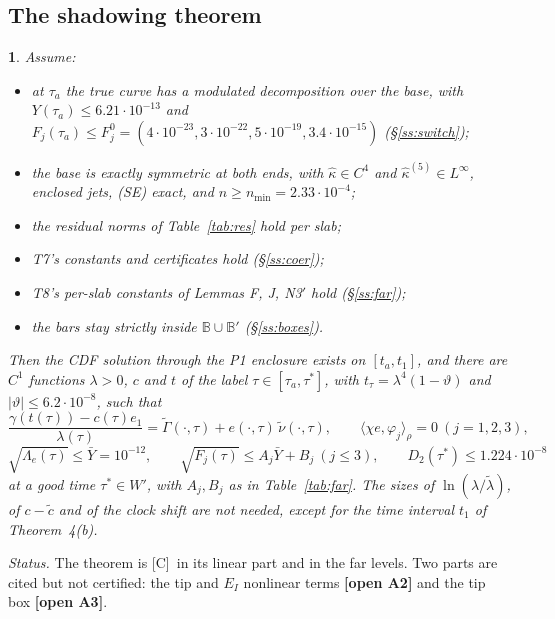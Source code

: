 \documentclass[11pt]{article}
\newtheorem*{namedthm*}{\thisthmname}
\newcommand{\thisthmname}{}
\newenvironment{named}[1]{\renewcommand{\thisthmname}{#1}\begin{namedthm*}}{\end{namedthm*}}
\theoremstyle{definition}
\theoremstyle{remark}
\newcommand{\tC}{\textnormal{\textsc{[C]}}}
\newcommand{\OPEN}[1]{\textcolor{red!75!black}{\textbf{\textsf{[open #1]}}}}
\newcommand{\ip}[2]{\langle #1,#2\rangle}
\newcommand{\abs}[1]{\lvert #1\rvert}
\newcommand{\Gt}{\tilde\Gamma}
\newcommand{\Yb}{\bar Y}
\newcommand{\Lam}{\Lambda}
\begin{document}
\subsection{The shadowing theorem}
\begin{named}{Theorem P2 (shadowing; consolidated from T5 \S1.3)}
Assume:
\begin{itemize}[leftmargin=2em]
\item[(I)] at $\tau_a$ the true curve has a modulated decomposition over the base, with $Y(\tau_a)\le6.21\cdot10^{-13}$ and $F_j(\tau_a)\le F_j^0=(4\cdot10^{-23},3\cdot10^{-22},5\cdot10^{-19},3.4\cdot10^{-15})$ (\S\ref{ss:switch});
\item[(B)] the base is exactly symmetric at both ends, with $\hat\kappa\in C^4$ and $\hat\kappa^{(5)}\in L^\infty$, enclosed jets, (SE) exact, and $n\ge n_{\min}=2.33\cdot10^{-4}$;
\item[(R)] the residual norms of Table~\ref{tab:res} hold per slab;
\item[(C)] T7's constants and certificates hold (\S\ref{ss:coer});
\item[(F)] T8's per-slab constants of Lemmas F, J, N3$'$ hold (\S\ref{ss:far});
\item[($\mathbb B$)] the bars stay strictly inside $\mathbb B\cup\mathbb B'$ (\S\ref{ss:boxes}).
\end{itemize}
Then the CDF solution through the P1 enclosure exists on $[t_a,t_1]$, and there are $C^1$ functions $\lambda>0$, $c$ and $t$ of the label $\tau\in[\tau_a,\tau^*]$, with $t_\tau=\lambda^4(1-\vartheta)$ and $\abs\vartheta\le6.2\cdot10^{-8}$, such that
\[
\frac{\gamma(t(\tau))-c(\tau)e_1}{\lambda(\tau)}=\Gt(\cdot,\tau)+e(\cdot,\tau)\,\tilde\nu(\cdot,\tau),\qquad\ip{\chi e}{\varphi_j}_\rho=0\ (j=1,2,3),
\]
\[
\sqrt{\Lam_e(\tau)}\le\Yb=10^{-12},\qquad\sqrt{F_j(\tau)}\le A_j\Yb+B_j\ (j\le3),\qquad D_2(\tau^*)\le1.224\cdot10^{-8}
\]
at a good time $\tau^*\in W'$, with $A_j,B_j$ as in Table~\ref{tab:far}. The sizes of $\ln(\lambda/\tilde\lambda)$, of $c-\tilde c$ and of the clock shift are not needed, except for the time interval $t_1$ of Theorem~4(b).
\end{named}
\noindent\emph{Status.} The theorem is \tC\ in its linear part and in the far levels. Two parts are cited but not certified: the tip and $E_I$ nonlinear terms \OPEN{A2} and the tip box \OPEN{A3}.
\end{document}
